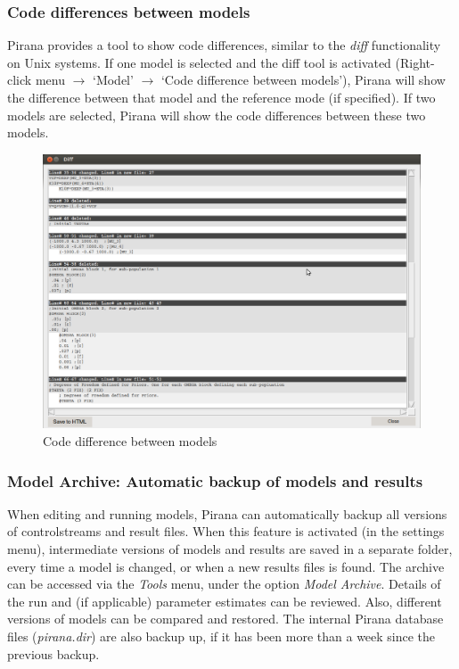{{{{\subsubsection*{Code differences between models}
Pirana provides a tool to show code differences, similar to the
\textit{diff} functionality on Unix systems. If one model is selected
and the diff tool is activated (Right-click menu $\rightarrow$
`Model' $\rightarrow$ `Code difference between models'), Pirana will
show the difference between that model and the reference mode (if
specified). If two models are selected, Pirana will show the code
differences between these two models.

\begin{figure}[H] \centering
    \includegraphics[scale=0.28]{images/diff.png}
    \caption{Code difference between models}
\end{figure}

\subsubsection*{Model Archive: Automatic backup of models and results}
When editing and running models, Pirana can automatically backup all
versions of controlstreams and result files. When this feature is
activated (in the settings menu), intermediate versions of models and
results are saved in a separate folder, every time a model is changed,
or when a new results files is found. The archive can be accessed via
the \textit{Tools} menu, under the option \textit{Model
  Archive}. Details of the run and (if applicable) parameter estimates
can be reviewed. Also, different versions of models can be compared
and restored. The internal Pirana database files (\textit{pirana.dir})
are also backup up, if it has been more than a week since the previous
backup.

}}}}
